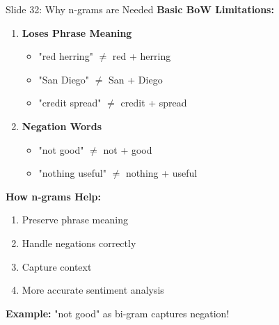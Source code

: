 \documentclass[8pt]{beamer}
\begin{document}
	\begin{frame}{Slide 32: Why n-grams are Needed}
		\fontsize{6.5}{7.5}\selectfont
		\textbf{Basic BoW Limitations:}
		\begin{enumerate}
			\item \textbf{Loses Phrase Meaning}
			\begin{itemize}
				\item "red herring" $\neq$ red + herring
				\item "San Diego" $\neq$ San + Diego
				\item "credit spread" $\neq$ credit + spread
			\end{itemize}
			\item \textbf{Negation Words}
			\begin{itemize}
				\item "not good" $\neq$ not + good
				\item "nothing useful" $\neq$ nothing + useful
			\end{itemize}
		\end{enumerate}
		
		\vspace{0.1cm}
		\textbf{How n-grams Help:}
		\begin{enumerate}
			\item Preserve phrase meaning
			\item Handle negations correctly
			\item Capture context
			\item More accurate sentiment analysis
		\end{enumerate}
		
		\textcolor{myblue}{\textbf{Example:}} "not good" as bi-gram captures negation!
	\end{frame}
	
\end{document}
